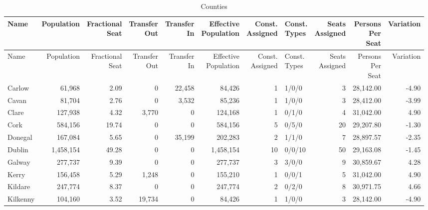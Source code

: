 \documentclass[a4paper]{article}
\begin{document}
\begin{longtable}{lrrrrrrlrrr}
\caption{Counties}
\\ \toprule
Name &Population &\shortstack{Fractional\\Seat} &\shortstack{Transfer\\Out} &\shortstack{Transfer\\In} &\shortstack{Effective\\Population} &\shortstack{Const.\\Assigned} &\shortstack{Const.\\Types} &\shortstack{Seats\\Assigned} &\shortstack{Persons\\Per\\Seat} &Variation \\ \midrule
\endfirsthead
\toprule
Name &Population &\shortstack{Fractional\\Seat} &\shortstack{Transfer\\Out} &\shortstack{Transfer\\In} &\shortstack{Effective\\Population} &\shortstack{Const.\\Assigned} &\shortstack{Const.\\Types} &\shortstack{Seats\\Assigned} &\shortstack{Persons\\Per\\Seat} &Variation \\ \midrule
\endhead
\bottomrule
\endfoot
Carlow&61,968& 2.09&0&22,458&84,426&1&1/0/0&3&28,142.00&-4.90\\ 
Cavan&81,704& 2.76&0&3,532&85,236&1&1/0/0&3&28,412.00&-3.99\\ 
Clare&127,938& 4.32&3,770&0&124,168&1&0/1/0&4&31,042.00& 4.90\\ 
Cork&584,156&19.74&0&0&584,156&5&0/5/0&20&29,207.80&-1.30\\ 
Donegal&167,084& 5.65&0&35,199&202,283&2&1/1/0&7&28,897.57&-2.35\\ 
Dublin&1,458,154&49.28&0&0&1,458,154&10&0/0/10&50&29,163.08&-1.45\\ 
Galway&277,737& 9.39&0&0&277,737&3&3/0/0&9&30,859.67& 4.28\\ 
Kerry&156,458& 5.29&1,248&0&155,210&1&0/0/1&5&31,042.00& 4.90\\ 
Kildare&247,774& 8.37&0&0&247,774&2&0/2/0&8&30,971.75& 4.66\\ 
Kilkenny&104,160& 3.52&19,734&0&84,426&1&1/0/0&3&28,142.00&-4.90\\ 

\end{longtable}
\end{document}
